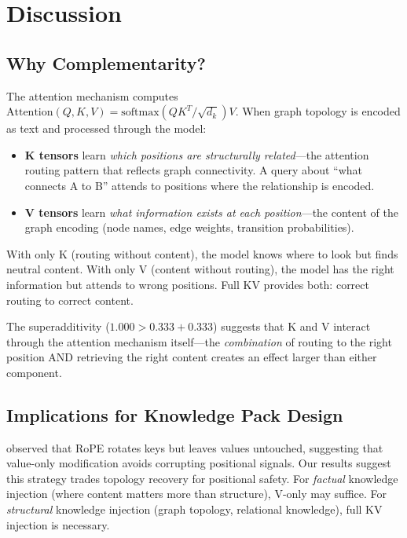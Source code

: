 \documentclass[11pt,a4paper]{article}
\begin{document}
\section{Discussion}

\subsection{Why Complementarity?}

The attention mechanism computes $\text{Attention}(Q, K, V) = \text{softmax}(QK^T / \sqrt{d_k}) V$. When graph topology is encoded as text and processed through the model:

\begin{itemize}
    \item \textbf{K tensors} learn \textit{which positions are structurally related}---the attention routing pattern that reflects graph connectivity. A query about ``what connects A to B'' attends to positions where the relationship is encoded.
    \item \textbf{V tensors} learn \textit{what information exists at each position}---the content of the graph encoding (node names, edge weights, transition probabilities).
\end{itemize}

With only K (routing without content), the model knows where to look but finds neutral content. With only V (content without routing), the model has the right information but attends to wrong positions. Full KV provides both: correct routing to correct content.

The superadditivity ($1.000 > 0.333 + 0.333$) suggests that K and V interact through the attention mechanism itself---the \textit{combination} of routing to the right position AND retrieving the right content creates an effect larger than either component.

\subsection{Implications for Knowledge Pack Design}

\citet{pustovit2026knowledge} observed that RoPE rotates keys but leaves values untouched, suggesting that value-only modification avoids corrupting positional signals. Our results suggest this strategy trades topology recovery for positional safety. For \textit{factual} knowledge injection (where content matters more than structure), V-only may suffice. For \textit{structural} knowledge injection (graph topology, relational knowledge), full KV injection is necessary.
\end{document}
